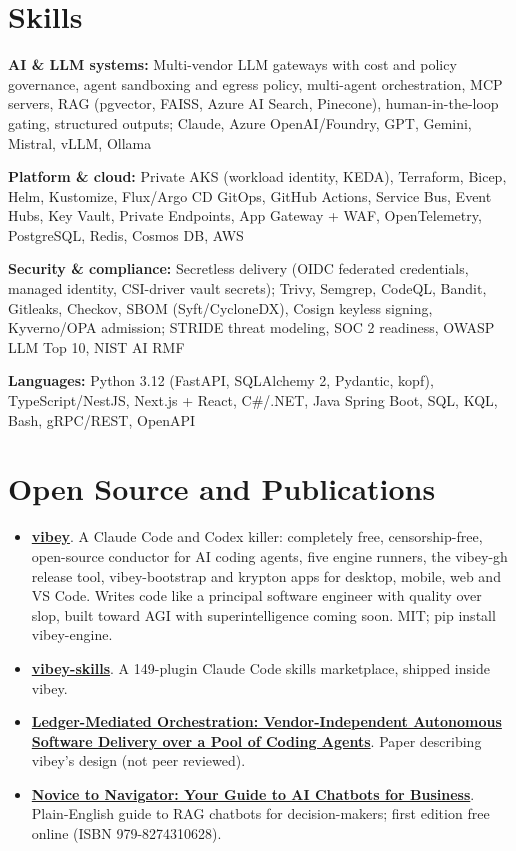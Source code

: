 \documentclass[10pt,letterpaper]{article}
\newcommand{\szmeta}{\fontsize{8pt}{10pt}\selectfont}
\begin{document}
\section*{Skills}
{\szmeta \textbf{AI \& LLM systems:} Multi-vendor LLM gateways with cost and policy governance, agent sandboxing and egress policy, multi-agent orchestration, MCP servers, RAG (pgvector, FAISS, Azure AI Search, Pinecone), human-in-the-loop gating, structured outputs; Claude, Azure OpenAI/Foundry, GPT, Gemini, Mistral, vLLM, Ollama\par\vspace{2pt}\textbf{Platform \& cloud:} Private AKS (workload identity, KEDA), Terraform, Bicep, Helm, Kustomize, Flux/Argo CD GitOps, GitHub Actions, Service Bus, Event Hubs, Key Vault, Private Endpoints, App Gateway + WAF, OpenTelemetry, PostgreSQL, Redis, Cosmos DB, AWS\par\vspace{2pt}\textbf{Security \& compliance:} Secretless delivery (OIDC federated credentials, managed identity, CSI-driver vault secrets); Trivy, Semgrep, CodeQL, Bandit, Gitleaks, Checkov, SBOM (Syft/CycloneDX), Cosign keyless signing, Kyverno/OPA admission; STRIDE threat modeling, SOC 2 readiness, OWASP LLM Top 10, NIST AI RMF\par\vspace{2pt}\textbf{Languages:} Python 3.12 (FastAPI, SQLAlchemy 2, Pydantic, kopf), TypeScript/NestJS, Next.js + React, C\#/.NET, Java Spring Boot, SQL, KQL, Bash, gRPC/REST, OpenAPI}\par
\section*{Open Source and Publications}\begin{itemize}
\item \textbf{\href{https://github.com/the-vibey-project/vibey}{vibey}}. A Claude Code and Codex killer: completely free, censorship-free, open-source conductor for AI coding agents, five engine runners, the vibey-gh release tool, vibey-bootstrap and krypton apps for desktop, mobile, web and VS Code. Writes code like a principal software engineer with quality over slop, built toward AGI with superintelligence coming soon. MIT; pip install vibey-engine.
\item \textbf{\href{https://github.com/the-vibey-project/vibey}{vibey-skills}}. A 149-plugin Claude Code skills marketplace, shipped inside vibey.
\item \textbf{\href{https://the-vibey-project.github.io/vibey/main/paper.pdf}{Ledger-Mediated Orchestration: Vendor-Independent Autonomous Software Delivery over a Pool of Coding Agents}}. Paper describing vibey's design (not peer reviewed).
\item \textbf{\href{https://vibewithadam.matthewsteinberger.com/novice-to-navigator}{Novice to Navigator: Your Guide to AI Chatbots for Business}}. Plain-English guide to RAG chatbots for decision-makers; first edition free online (ISBN 979-8274310628).
\end{itemize}
\end{document}
